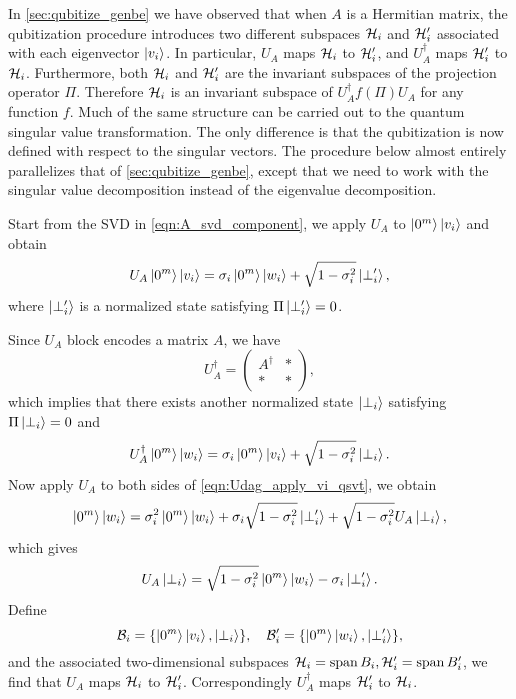 In \cref{sec:qubitize_genbe} we have observed that when $A$ is a Hermitian matrix, the qubitization procedure introduces two different subspaces $\mathcal{H}_i$ and $\mathcal{H}_i'$ associated with each eigenvector $\ket{v_i}$.
In particular, $U_A$ maps  $\mathcal{H}_i$ to $\mathcal{H}_i'$, and $U_A^{\dag}$ maps $\mathcal{H}_i'$ to $\mathcal{H}_i$. 
Furthermore, both $\mathcal{H}_i$ and $\mathcal{H}_i'$ are the invariant subspaces of the projection operator $\Pi$.
Therefore $\mathcal{H}_i$ is an invariant subspace of $U_A^{\dag} f(\Pi) U_A$ for any function $f$. 
Much of the same structure can be carried out to the quantum singular value transformation.
The only difference is that the qubitization is now defined with respect to the singular vectors. 
The procedure below almost entirely parallelizes that of \cref{sec:qubitize_genbe}, except that we need to work with the singular value decomposition instead of the eigenvalue decomposition.

Start from the SVD in \cref{eqn:A_svd_component}, we apply $U_A$ to $\ket{0^m}\ket{v_i}$ and obtain 
\begin{equation}
U_A\ket{0^m}\ket{v_i}=\sigma_i\ket{0^m}\ket{w_i}+\sqrt{1-\sigma_i^2}\ket{\perp_i'},
\label{eqn:UA_apply_vi_2_qsvt}
\end{equation}
where $\ket{\perp_i'}$ is a normalized state satisfying $\Pi\ket{\perp_i'}=0$.

Since $U_A$ block encodes a matrix $A$, we have
\begin{equation}
U_A^{\dag}=\begin{pmatrix}
{A}^{\dag} & {*} \\
{*} & {*}
\end{pmatrix},
\end{equation}
which implies that there exists another normalized state $\ket{\perp_i}$ satisfying $\Pi\ket{\perp_i}=0$ and
\begin{equation}
U^{\dag}_A\ket{0^m}\ket{w_i}=\sigma_i\ket{0^m}\ket{v_i}+\sqrt{1-\sigma_i^2}\ket{\perp_i}.
\label{eqn:Udag_apply_vi_qsvt}
\end{equation}
Now apply $U_A$ to both sides of \cref{eqn:Udag_apply_vi_qsvt}, we obtain
\begin{equation}
\ket{0^m}\ket{w_i}=\sigma^2_i\ket{0^m}\ket{w_i}+\sigma_i\sqrt{1-\sigma_i^2}\ket{\perp_i'} +\sqrt{1-\sigma_i^2}U_A\ket{\perp_i},
\end{equation}
which gives
\begin{equation}
U_A\ket{\perp_i}=\sqrt{1-\sigma_i^2}\ket{0^m}\ket{w_i}-\sigma_i\ket{\perp_i'}.
\label{eqn:UA_apply_perpi_2_qsvt}
\end{equation}
Define
\begin{equation}
\mathcal{B}_i=\{\ket{0^m}\ket{v_i},\ket{\perp_i}\}, \quad \mathcal{B}'_i=\{\ket{0^m}\ket{w_i},\ket{\perp_i'}\},
\end{equation}
and the associated two-dimensional subspaces $\mathcal{H}_i=\operatorname{span}{B_i}, \mathcal{H}'_i=\operatorname{span}{B_i'}$, we find that $U_A$ maps $\mathcal{H}_i$ to $\mathcal{H}_i'$.
Correspondingly $U_A^{\dag}$ maps $\mathcal{H}_i'$ to $\mathcal{H}_i$.

